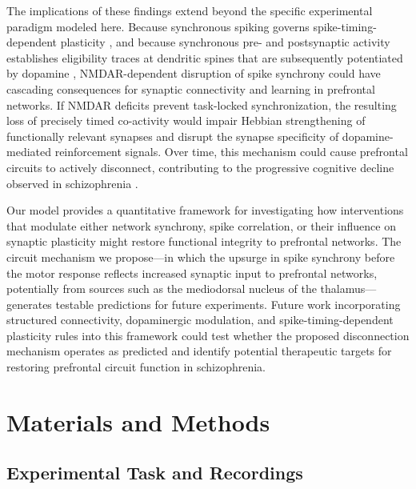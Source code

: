 \documentclass[10pt]{article}
\begin{document}
The implications of these findings extend beyond the specific experimental paradigm modeled here. Because synchronous spiking governs spike-timing-dependent plasticity \citep{dan2004spike}, and because synchronous pre- and postsynaptic activity establishes eligibility traces at dendritic spines that are subsequently potentiated by dopamine \citep{he2015eligibility, yagishita2014critical}, NMDAR-dependent disruption of spike synchrony could have cascading consequences for synaptic connectivity and learning in prefrontal networks. If NMDAR deficits prevent task-locked synchronization, the resulting loss of precisely timed co-activity would impair Hebbian strengthening of functionally relevant synapses and disrupt the synapse specificity of dopamine-mediated reinforcement signals. Over time, this mechanism could cause prefrontal circuits to actively disconnect, contributing to the progressive cognitive decline observed in schizophrenia \citep{zick2018blocking, zick2021disparate}.

Our model provides a quantitative framework for investigating how interventions that modulate either network synchrony, spike correlation, or their influence on synaptic plasticity might restore functional integrity to prefrontal networks. The circuit mechanism we propose---in which the upsurge in spike synchrony before the motor response reflects increased synaptic input to prefrontal networks, potentially from sources such as the mediodorsal nucleus of the thalamus---generates testable predictions for future experiments. Future work incorporating structured connectivity, dopaminergic modulation, and spike-timing-dependent plasticity rules into this framework could test whether the proposed disconnection mechanism operates as predicted and identify potential therapeutic targets for restoring prefrontal circuit function in schizophrenia.

\section{Materials and Methods}

\subsection{Experimental Task and Recordings}
\end{document}

